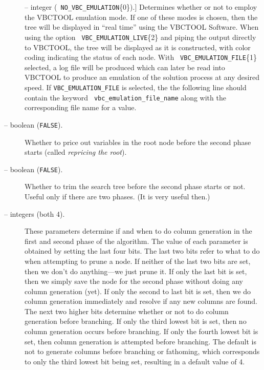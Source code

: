 \begin{description}
\item[] -- integer ({\tt
NO\_VBC\_EMULATION}\{0\}).] 
Determines whether or not to employ the VBCTOOL emulation mode. If
one of these modes is chosen, then the tree will be displayed in
``real time'' using the VBCTOOL Software. When using the option {\tt
VBC\_EMULATION\_LIVE}\{2\} and piping the output directly to VBCTOOL, the
tree will be displayed as it is constructed, with color coding
indicating the status of each node. With {\tt
VBC\_EMULATION\_FILE}\{1\} selected, a log file will be produced which
can later be read into VBCTOOL to produce an emulation of the
solution process at any desired speed. If {\tt VBC\_EMULATION\_FILE}
is selected, the the following line should contain the keyword {\tt
vbc\_emulation\_file\_name} along with the corresponding file name
for a value.

\item[ -- boolean ({\tt FALSE}).] 
Whether to price out variables in the root node before the second
phase starts (called {\em repricing the root}). 

\item[ -- boolean ({\tt FALSE}).] 
Whether to trim the search tree before the second phase starts or not. Useful
only if there are two phases. (It is very useful then.)

\item[ --
integers (both 4).] 
These parameters determine if and when to do
column generation in the first and second phase of the algorithm. The
value of each parameter is obtained by setting the last four bits.
The last two bits refer to what to do when attempting to prune a node.
If neither of the last two bits are set, then we don't do
anything---we just prune it. If only the last bit is set, then we
simply save the node for the second phase without doing any column
generation (yet). If only the second to last bit is set, then we do
column generation immediately and resolve if any new columns are
found. The next two higher bits determine whether or not to do column
generation before branching. If only the third lowest bit is set, then no
column generation occurs before branching. If only the fourth lowest bit is
set, then column generation is attempted before branching. The default
is not to generate columns before branching or fathoming, which
corresponds to only the third lowest bit being set, resulting in a
default value of 4.


\end{description}
